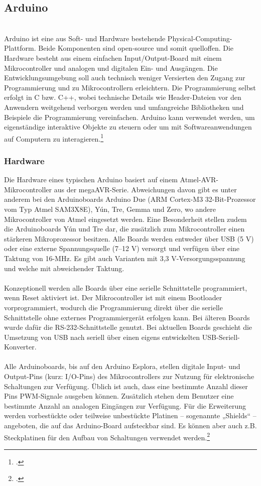 \subsection{Arduino}\ \\
Arduino ist eine aus Soft- und Hardware bestehende Physical-Computing-Plattform. Beide Komponenten sind open-source und somit quelloffen. Die Hardware besteht aus einem einfachen Input/Output-Board mit einem Mikrocontroller und analogen und digitalen Ein- und Ausgängen. Die Entwicklungsumgebung soll auch technisch weniger Versierten den Zugang zur Programmierung und zu Mikrocontrollern erleichtern. Die Programmierung selbst erfolgt in C bzw. C++, wobei technische Details wie Header-Dateien vor den Anwendern weitgehend verborgen werden und umfangreiche Bibliotheken und Beispiele die Programmierung vereinfachen. Arduino kann verwendet werden, um eigenständige interaktive Objekte zu steuern oder um mit Softwareanwendungen auf Computern zu interagieren.\footcite{arduino_wiki}

\subsubsection{Hardware}
Die Hardware eines typischen Arduino basiert auf einem Atmel-AVR-Mikrocontroller aus der megaAVR-Serie. Abweichungen davon gibt es unter anderem bei den Arduinoboards Arduino Due (ARM Cortex-M3 32-Bit-Prozessor vom Typ Atmel SAM3X8E), Yún, Tre, Gemma und Zero, wo andere Mikrocontroller von Atmel eingesetzt werden. Eine Besonderheit stellen zudem die Arduinoboards Yún und Tre dar, die zusätzlich zum Mikrocontroller einen stärkeren Mikroprozessor besitzen. Alle Boards werden entweder über USB (5 V) oder eine externe Spannungsquelle (7–12 V) versorgt und verfügen über eine Taktung von 16-MHz. Es gibt auch Varianten mit 3,3 V-Versorgungsspannung und welche mit abweichender Taktung.\\
\\
Konzeptionell werden alle Boards über eine serielle Schnittstelle programmiert, wenn Reset aktiviert ist. Der Mikrocontroller ist mit einem Bootloader vorprogrammiert, wodurch die Programmierung direkt über die serielle Schnittstelle ohne externes Programmiergerät erfolgen kann. Bei älteren Boards wurde dafür die RS-232-Schnittstelle genutzt. Bei aktuellen Boards geschieht die Umsetzung von USB nach seriell über einen eigens entwickelten USB-Seriell-Konverter.\\
\\
Alle Arduinoboards, bis auf den Arduino Esplora, stellen digitale Input- und Output-Pins (kurz: I/O-Pins) des Mikrocontrollers zur Nutzung für elektronische Schaltungen zur Verfügung. Üblich ist auch, dass eine bestimmte Anzahl dieser Pins PWM-Signale ausgeben können. Zusätzlich stehen dem Benutzer eine bestimmte Anzahl an analogen Eingängen zur Verfügung. Für die Erweiterung werden vorbestückte oder teilweise unbestückte Platinen – sogenannte „Shields“ – angeboten, die auf das Arduino-Board aufsteckbar sind. Es können aber auch z.B. Steckplatinen für den Aufbau von Schaltungen verwendet werden.\footcite{arduino_wiki}


